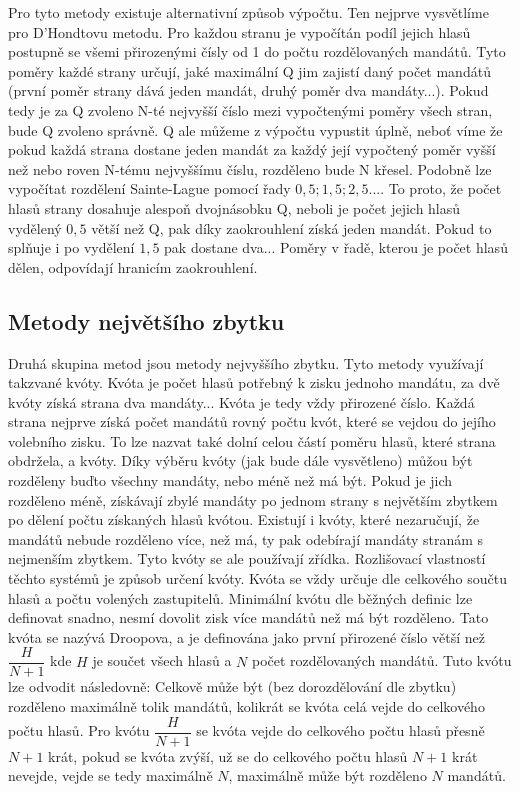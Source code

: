 \documentclass[12pt]{report}
\begin{document}
Pro tyto metody existuje alternativní způsob výpočtu.
Ten nejprve vysvětlíme pro D'Hondtovu metodu.
Pro každou stranu je vypočítán podíl jejich hlasů postupně se všemi přirozenými čísly od 1 do počtu rozdělovaných mandátů.
Tyto poměry každé strany určují, jaké maximální Q jim zajistí daný počet mandátů (první poměr strany dává jeden mandát, druhý poměr dva mandáty...).
Pokud tedy je za Q zvoleno N-té nejvyšší číslo mezi vypočtenými poměry všech stran, bude Q zvoleno správně.
Q ale můžeme z výpočtu vypustit úplně, neboť víme že pokud každá strana dostane jeden mandát za každý její vypočtený poměr vyšší než nebo roven N-tému nejvyššímu číslu, rozděleno bude N křesel.
Podobně lze vypočítat rozdělení Sainte-Lague pomocí řady $0{,}5; 1{,}5; 2{,}5...$.
To proto, že počet hlasů strany dosahuje alespoň dvojnásobku Q, neboli je počet jejich hlasů vydělený $0{,}5$ větší než Q, pak díky zaokrouhlení získá jeden mandát.
Pokud to splňuje i po vydělení $1{,}5$ pak dostane dva...
Poměry v řadě, kterou je počet hlasů dělen, odpovídají hranicím zaokrouhlení.
\subsection{Metody největšího zbytku} 
Druhá skupina metod jsou metody nejvyššího zbytku.
Tyto metody využívají takzvané kvóty.
Kvóta je počet hlasů potřebný k zisku jednoho mandátu, za dvě kvóty získá strana dva mandáty...
Kvóta je tedy vždy přirozené číslo.
Každá strana nejprve získá počet mandátů rovný počtu kvót, které se vejdou do jejího volebního zisku.
To lze nazvat také dolní celou částí poměru hlasů, které strana obdržela, a kvóty.
Díky výběru kvóty (jak bude dále vysvětleno) můžou být rozděleny buďto všechny mandáty, nebo méně než má být.
Pokud je jich rozděleno méně, získávají zbylé mandáty po jednom strany s největším zbytkem po dělení počtu získaných hlasů kvótou.
Existují i kvóty, které nezaručují, že mandátů nebude rozděleno více, než má, ty pak odebírají mandáty stranám s nejmenším zbytkem.
Tyto kvóty se ale používají zřídka.
Rozlišovací vlastností těchto systémů je způsob určení kvóty.
Kvóta se vždy určuje dle celkového součtu hlasů a počtu volených zastupitelů.
Minimální kvótu dle běžných definic lze definovat snadno, nesmí dovolit zisk více mandátů než má být rozděleno.
Tato kvóta se nazývá Droopova, a je definována jako první přirozené číslo větší než $\dfrac{H}{N+1}$ kde $H$ je součet všech hlasů a $N$ počet rozdělovaných mandátů.
Tuto kvótu lze odvodit následovně: Celkově může být (bez dorozdělování dle zbytku) rozděleno maximálně tolik mandátů, kolikrát se kvóta celá vejde do celkového počtu hlasů.
Pro kvótu $\dfrac{H}{N+1}$ se kvóta vejde do celkového počtu hlasů přesně $N+1$ krát, pokud se kvóta zvýší, už se do celkového počtu hlasů $N+1$ krát nevejde, vejde se tedy maximálně $N$, maximálně může být rozděleno $N$ mandátů.
\end{document}
